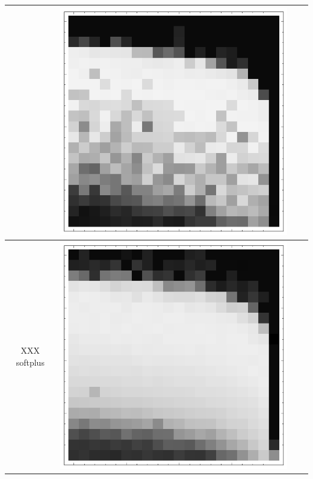 \documentclass[10pt]{article}
\begin{document}
\begin{tabular}{|c|c|c|c|}
        & \includegraphics[scale=0.25]{plots/simple/LF-40R20R10R-20T10-MNIST-6.png} \\ \hline
XXX softplus 
        & \includegraphics[scale=0.25]{plots/simple/LF-20B10B-20T10-MNIST-6.png}

\end{tabular}
\end{document}
